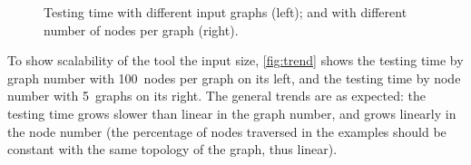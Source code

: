 \begin{figure}[!t]
\begin{minipage}[t]{0.44\textwidth}
\begin{adjustbox}{width=0.8\textwidth}
    \end{adjustbox}    
\end{minipage}
\caption{Testing time  with different input graphs (left); and with different number
    of nodes per graph (right).}
    \label{fig:trend}
\end{figure}


To show scalability of the tool \wrt the input size, 
\autoref{fig:trend} shows the testing time by graph number with
100~nodes per graph on its left, and the testing time by
node number with 5~graphs on its right. The general trends are as expected: the testing time
grows slower than linear in the graph number, and grows linearly in the node number (the percentage of nodes traversed in the examples should be constant with
the same topology of the graph, thus linear). 

